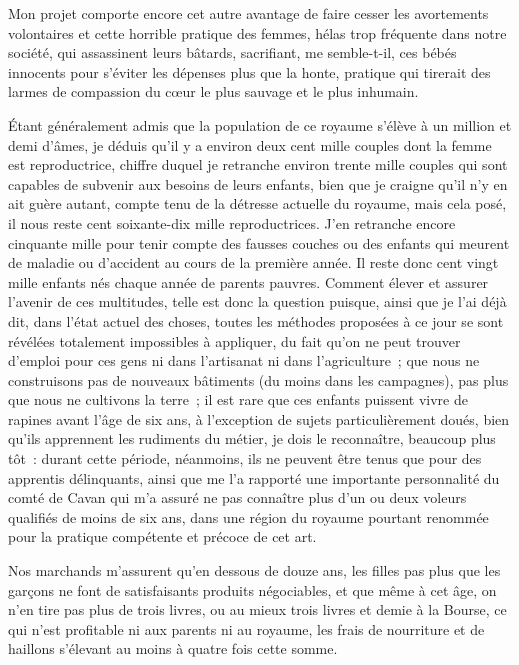\documentclass[french,twoside]{book} %
\begin{document}
Mon projet comporte encore cet autre avantage de faire cesser les avortements volontaires et cette horrible pratique des femmes, hélas trop fréquente dans notre société, qui assassinent leurs bâtards, sacrifiant, me semble-t-il, ces bébés innocents pour s’éviter les dépenses plus que la honte, pratique qui tirerait des larmes de compassion du cœur le plus sauvage et le plus inhumain.\par
Étant généralement admis que la population de ce royaume s’élève à un million et demi d’âmes, je déduis qu’il y a environ deux cent mille couples dont la femme est reproductrice, chiffre duquel je retranche environ trente mille couples qui sont capables de subvenir aux besoins de leurs enfants, bien que je craigne qu’il n’y en ait guère autant, compte tenu de la détresse actuelle du royaume, mais cela posé, il nous reste cent soixante-dix mille reproductrices. J’en retranche encore cinquante mille pour tenir compte des fausses couches ou des enfants qui meurent de maladie ou d’accident au cours de la première année. Il reste donc cent vingt mille enfants nés chaque année de parents pauvres. Comment élever et assurer l’avenir de ces multitudes, telle est donc la question puisque, ainsi que je l’ai déjà dit, dans l’état actuel des choses, toutes les méthodes proposées à ce jour se sont révélées totalement impossibles à appliquer, du fait qu’on ne peut trouver d’emploi pour ces gens ni dans l’artisanat ni dans l’agriculture ; que nous ne construisons pas de nouveaux bâtiments (du moins dans les campagnes), pas plus que nous ne cultivons la terre ; il est rare que ces enfants puissent vivre de rapines avant l’âge de six ans, à l’exception de sujets particulièrement doués, bien qu’ils apprennent les rudiments du métier, je dois le reconnaître, beaucoup plus tôt : durant cette période, néanmoins, ils ne peuvent être tenus que pour des apprentis délinquants, ainsi que me l’a rapporté une importante personnalité du comté de Cavan qui m’a assuré ne pas connaître plus d’un ou deux voleurs qualifiés de moins de six ans, dans une région du royaume pourtant renommée pour la pratique compétente et précoce de cet art.\par
Nos marchands m’assurent qu’en dessous de douze ans, les filles pas plus que les garçons ne font de satisfaisants produits négociables, et que même à cet âge, on n’en tire pas plus de trois livres, ou au mieux trois livres et demie à la Bourse, ce qui n’est profitable ni aux parents ni au royaume, les frais de nourriture et de haillons s’élevant au moins à quatre fois cette somme.\par
\end{document}
